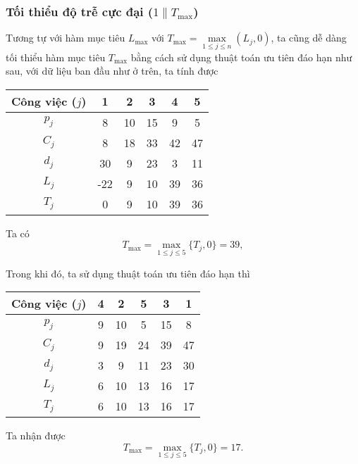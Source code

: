 \documentclass[12pt,a4paper]{report}
\begin{document}
\subsubsection*{Tối thiểu độ trễ cực đại ($1 \| T_{\max}$)}
Tương tự với hàm mục tiêu $L_{\max}$ với $T_{\max}=\underset{1 \leq j \leq n}{\max} (L_j,0)$, ta cũng dễ dàng tối thiểu hàm mục tiêu $T_{\max}$ bằng cách sử dụng thuật toán ưu tiên đáo hạn như sau, với dữ liệu ban đầu như ở trên, ta tính được

\begin{table}[h!]
	\centering
	\begin{tabular}{|c | c c c c c |} 
	\hline
	Công việc ($j$) & 1 & 2 & 3 & 4 & 5 \\
	\hline\hline
	$p_j$ & 8 & 10 & 15 & 9 & 5 \\
	$C_j$ & 8 & 18 & 33 & 42 & 47 \\
	$d_j$ & 30 & 9 & 23 & 3 & 11 \\
	$L_j$ & -22 & 9 & 10 & 39 & 36 \\
	$T_j$ & 0 & 9 & 10 & 39 & 36 \\
	\hline
	\end{tabular}
\end{table}
Ta có
\begin{equation*}
	T_{\max} = \max _{1 \leq j \leq 5} \{T_j, 0\} = 39,
\end{equation*}

Trong khi đó, ta sử dụng thuật toán ưu tiên đáo hạn thì

\begin{table}[h!]
	\centering
	\begin{tabular}{|c | c c c c c |} 
	\hline
	Công việc ($j$) & 4 & 2 & 5 & 3 & 1 \\
	\hline\hline
	$p_j$ & 9 & 10 & 5 & 15 & 8 \\
	$C_j$ & 9 & 19 & 24 & 39 & 47 \\
	$d_j$ & 3 & 9 & 11 & 23 & 30 \\
	$L_j$ & 6 & 10 & 13 & 16 & 17 \\
	$T_j$ & 6 & 10 & 13 & 16 & 17 \\
	\hline
	\end{tabular}
\end{table}

Ta nhận được
\begin{equation*}
	T_{\max} = \max _{1 \leq j \leq 5} \{T_j, 0\} = 17.
\end{equation*}
\end{document}
